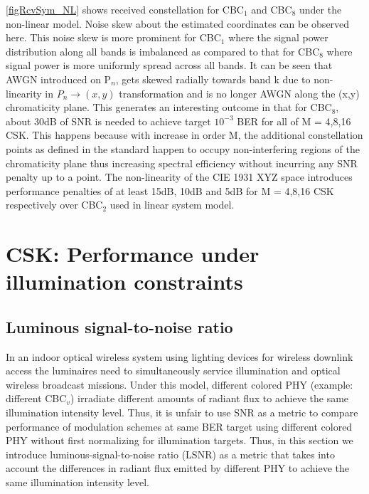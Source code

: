 \documentclass[10pt,letterpaper]{article}
\begin{document}
\figurename\ref{figRcvSym_NL} shows received constellation for CBC$_{1}$ and CBC$_{8}$ under the non-linear model. Noise skew about the estimated coordinates can be observed here. This noise skew is more prominent for CBC$_{1}$ where the signal power distribution along all bands is imbalanced as compared to that for CBC$_{8}$ where signal power is more uniformly spread across all bands. It can be seen that AWGN introduced on P$_{n}$, gets skewed radially towards band k due to non-linearity in $P_{n}\rightarrow (x,y)$ transformation and is no longer AWGN along the (x,y) chromaticity plane. This generates an interesting outcome in that for CBC$_{8}$, about 30dB of SNR is needed to achieve target $10^{-3}$ BER for all of M = 4,8,16 CSK. This happens because with increase in order M, the additional constellation points as defined in the standard happen to occupy non-interfering regions of the chromaticity plane thus increasing spectral efficiency without incurring any SNR penalty up to a point. The non-linearity of the CIE 1931 XYZ space introduces performance penalties of at least 15dB, 10dB and 5dB for M = 4,8,16 CSK respectively over CBC$_{2}$ used in linear system model.

\section{CSK: Performance under illumination constraints}\label{sCSKLSNR}

\subsection{Luminous signal-to-noise ratio}\label{ssLSNR}

In an indoor optical wireless system using lighting devices for wireless downlink access the luminaires need to simultaneously service illumination and optical wireless broadcast missions. Under this model, different colored PHY (example: different CBC$_{v}$) irradiate different amounts of radiant flux to achieve the same illumination intensity level. Thus, it is unfair to use SNR as a metric to compare performance of modulation schemes at same BER target using different colored PHY without first normalizing for illumination targets. Thus, in this section we introduce luminous-signal-to-noise ratio (LSNR) as a metric that takes into account the differences in radiant flux emitted by different PHY to achieve the same illumination intensity level.
\end{document}
